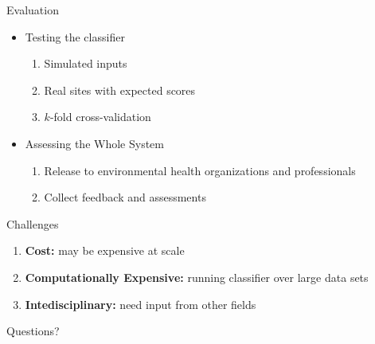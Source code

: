 \documentclass{beamer}
\begin{document}
\begin{frame}
    \huge{Evaluation}\normalsize
    \begin{itemize}
        \item<1->\large{\alert<2-4>{Testing the classifier}}\normalsize
        \begin{enumerate}
            \item<2-> Simulated inputs
            \item<3-> Real sites with expected scores
            \item<4-> $k$-fold cross-validation
        \end{enumerate}
        \item<5->\large{\alert<5-7>{Assessing the Whole System}}\normalsize
        \begin{enumerate}
            \item<6-> Release to environmental health organizations and professionals
            \item<7-> Collect feedback and assessments
        \end{enumerate}
    \end{itemize}
\end{frame}

\begin{frame}
    \huge{Challenges}\large
    \begin{enumerate}
        \item<2-> \textbf{Cost:} may be expensive at scale
        \item<3-> \textbf{Computationally Expensive:} running classifier over large data sets
        \item<4-> \textbf{Intedisciplinary:} need input from other fields
    \end{enumerate}
\end{frame}

\begin{frame}
    \huge{Questions?}
\end{frame}
\end{document}
